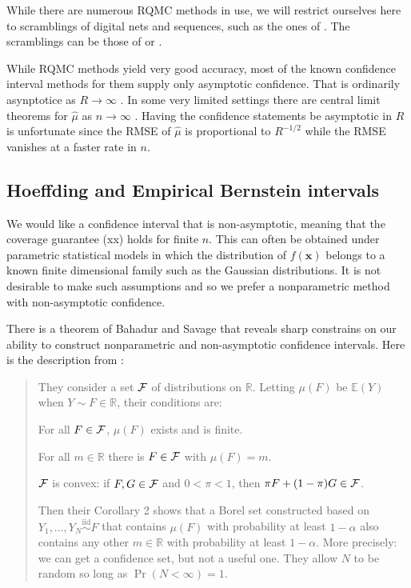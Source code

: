 \documentclass{article}
\newcommand{\real}{\mathbb{R}}
\newcommand{\e}{\mathbb{E}}
\newcommand{\bsx}{\boldsymbol{x}}
\begin{document}
While there are numerous RQMC methods in use, we
will restrict ourselves here to scramblings of digital nets
and sequences, such as the ones of \cite{Sob67}.
The scramblings can be those of \cite{Owe95} or
\cite{Mat98}.


While RQMC methods yield very good accuracy, most
of the known confidence interval methods for them
supply only asymptotic confidence. That is ordinarily
asynptotice as $R\to\infty$ \cite{naka:tuff:2024}.
In some very limited settings
there are central limit theorems for $\hat\mu$
as $n\to\infty$ \cite{Loh01}.
Having the confidence statements be asymptotic in $R$
is unfortunate since the RMSE of $\hat\mu$ 
is proportional to $R^{-1/2}$ while the RMSE
vanishes at a faster rate in $n$.



\subsection{Hoeffding and Empirical Bernstein intervals}

We would like a confidence interval that is non-asymptotic,
meaning that the coverage guarantee (xx) holds for finite $n$.
This can often be obtained under parametric statistical
models in which the distribution of $f(\bsx)$  belongs
to a known finite dimensional family such as the Gaussian
distributions.  It is not desirable to make such assumptions
and so we prefer a nonparametric method with non-asymptotic
confidence.  

There is a theorem of Bahadur and Savage \cite{BahSav56} that
reveals sharp constrains on our ability to construct
nonparametric and non-asymptotic confidence
intervals.  Here is the description from \cite{err4qmc}:
\begin{quote}They consider a set $\mathcal{F}$ of distributions on $\real$.
Letting $\mu(F)$ be $\e(Y)$ when $Y\sim F\in\real$, their conditions are:
\begin{compactenum}[\quad (i)]
\item For all $F\in\mathcal{F}$, $\mu(F)$ exists and is finite.
\item For all $m\in\real$ there is $F\in\mathcal{F}$ with $\mu(F)=m$.
\item $\mathcal{F}$ is convex: if $F,G\in\mathcal{F}$ and $0<\pi<1$,
  then $\pi F+(1-\pi)G\in \mathcal{F}$.
\end{compactenum}
Then their Corollary 2 shows that a Borel set constructed
based on $Y_1,\dots,Y_N\stackrel{\mathrm{iid}}
\sim F$
that contains $\mu(F)$ with probability at least $1-\alpha$
also contains any other $m\in\real$ with probability at least $1-\alpha$.
More precisely: we can get a confidence set, but not a useful one.
They allow $N$ to be random so long as $\Pr(N<\infty)=1$.
\end{quote}
\end{document}
